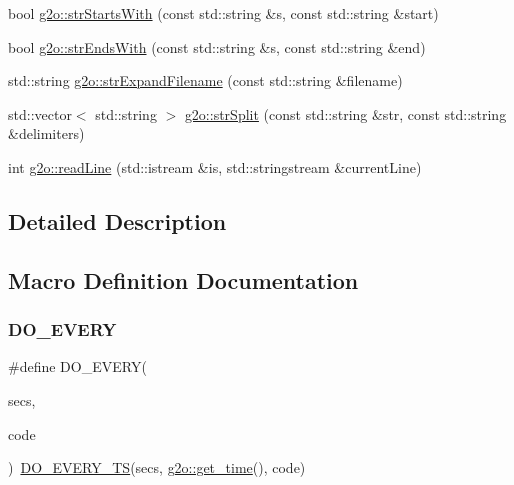 \begin{DoxyCompactItemize}
\item 
bool \mbox{\hyperlink{group__utils_ga98f10a2fabad17ef7ed1534b39eb2bc5}{g2o\+::str\+Starts\+With}} (const std\+::string \&s, const std\+::string \&start)
\item 
bool \mbox{\hyperlink{group__utils_ga7a0e6ad89c4c86b2b60ddf392a57c963}{g2o\+::str\+Ends\+With}} (const std\+::string \&s, const std\+::string \&end)
\item 
std\+::string \mbox{\hyperlink{group__utils_ga45c2648d8a8a5f5bed13741bc8a501d1}{g2o\+::str\+Expand\+Filename}} (const std\+::string \&filename)
\item 
std\+::vector$<$ std\+::string $>$ \mbox{\hyperlink{group__utils_ga0a56de67e98afa3f8307e7b4ddb4cc83}{g2o\+::str\+Split}} (const std\+::string \&str, const std\+::string \&delimiters)
\item 
int \mbox{\hyperlink{group__utils_ga570513203e2bbf23d692460c0aef07e8}{g2o\+::read\+Line}} (std\+::istream \&is, std\+::stringstream \&current\+Line)
\end{DoxyCompactItemize}


\subsection{Detailed Description}


\subsection{Macro Definition Documentation}
\mbox{\label{group__utils_gabfe958da8833edbe74250507adc61635}} 
\subsubsection{\texorpdfstring{D\+O\+\_\+\+E\+V\+E\+RY}{DO\_EVERY}}
{\footnotesize\ttfamily \#define D\+O\+\_\+\+E\+V\+E\+RY(\begin{DoxyParamCaption}\item[{}]{secs,  }\item[{}]{code }\end{DoxyParamCaption})~\mbox{\hyperlink{group__utils_ga9b9f34c01b03b47644c2762bf256be32}{D\+O\+\_\+\+E\+V\+E\+R\+Y\+\_\+\+TS}}(secs, \mbox{\hyperlink{namespaceg2o_a6baa8fdfd973b5b970df14f14fd5d844}{g2o\+::get\+\_\+time}}(), code)}



